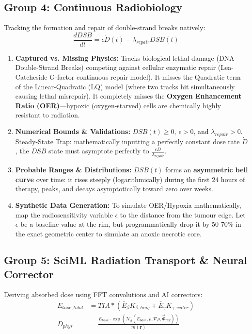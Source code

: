 \documentclass[11pt,a4paper]{article}
\begin{document}
\subsection{Group 4: Continuous Radiobiology}

Tracking the formation and repair of double-strand breaks natively:
\begin{equation}
    \frac{dDSB}{dt} = \epsilon \dot{D}(t) - \lambda_{repair}DSB(t)
\end{equation}

\begin{enumerate}
    \item \textbf{Captured vs. Missing Physics:} Tracks biological lethal damage (DNA Double-Strand Breaks) competing against cellular enzymatic repair (Lea-Catcheside G-factor continuous repair model). It misses the Quadratic term of the Linear-Quadratic (LQ) model (where two tracks hit simultaneously causing lethal misrepair). It completely misses the \textbf{Oxygen Enhancement Ratio (OER)}---hypoxic (oxygen-starved) cells are chemically highly resistant to radiation.
    \item \textbf{Numerical Bounds \& Validations:} $DSB(t) \ge 0$, $\epsilon > 0$, and $\lambda_{repair} > 0$. Steady-State Trap: mathematically inputting a perfectly constant dose rate $\dot{D}$, the $DSB$ state must asymptote perfectly to $\frac{\epsilon \dot{D}}{\lambda_{repair}}$.
    \item \textbf{Probable Ranges \& Distributions:} $DSB(t)$ forms an \textbf{asymmetric bell curve} over time: it rises steeply (logarithmically) during the first 24 hours of therapy, peaks, and decays asymptotically toward zero over weeks.
    \item \textbf{Synthetic Data Generation:} To simulate OER/Hypoxia mathematically, map the radiosensitivity variable $\epsilon$ to the distance from the tumour edge. Let $\epsilon$ be a baseline value at the rim, but programmatically drop it by 50-70\% in the exact geometric center to simulate an anoxic necrotic core.
\end{enumerate}

\subsection{Group 5: SciML Radiation Transport \& Neural Corrector}

Deriving absorbed dose using FFT convolutions and AI correctors:
\begin{align}
    E_{base,total} &= TIA \ast (\bar{E}_{\beta} K_{\beta,lung} + \bar{E}_{\gamma} K_{\gamma,water}) \\
    D_{phys} &= \frac{E_{base} \cdot \exp(\mathcal{N}_\theta(E_{base}, \rho, \nabla\rho, \vec{\Phi}_{ray}))}{m(\mathbf{r})}
\end{align}
\end{document}
